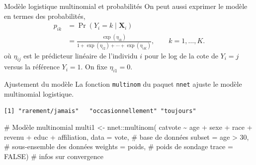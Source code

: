 \documentclass[
  ignorenonframetext,
]{beamer}
\newenvironment{Shaded}{\begin{snugshade}}{\end{snugshade}}
\newcommand{\AttributeTok}[1]{\textcolor[rgb]{0.40,0.45,0.13}{#1}}
\newcommand{\CommentTok}[1]{\textcolor[rgb]{0.37,0.37,0.37}{#1}}
\newcommand{\ConstantTok}[1]{\textcolor[rgb]{0.56,0.35,0.01}{#1}}
\newcommand{\DecValTok}[1]{\textcolor[rgb]{0.68,0.00,0.00}{#1}}
\newcommand{\FunctionTok}[1]{\textcolor[rgb]{0.28,0.35,0.67}{#1}}
\newcommand{\NormalTok}[1]{\textcolor[rgb]{0.00,0.23,0.31}{#1}}
\newcommand{\OtherTok}[1]{\textcolor[rgb]{0.00,0.23,0.31}{#1}}
\newcommand{\SpecialCharTok}[1]{\textcolor[rgb]{0.37,0.37,0.37}{#1}}
\newcommand{\StringTok}[1]{\textcolor[rgb]{0.13,0.47,0.30}{#1}}
\begin{document}
\begin{frame}{Modèle logistique multinomial et probabilités}
\protect\hypertarget{moduxe8le-logistique-multinomial-et-probabilituxe9s}{}
On peut aussi exprimer le modèle en termes des probabilités,
\begin{align*}
 p_{ik} &= \Pr(Y_i=k \mid \mathbf{X}_i) \\&= \frac{\exp(\eta_{ik})}{1+ \exp(\eta_{i2}) + \cdots + \exp(\eta_{iK})}, \qquad k =1, \ldots, K.
\end{align*} où \(\eta_{ij}\) est le prédicteur linéaire de l'individu
\(i\) pour le log de la cote de \(Y_i=j\) versus la référence \(Y_i=1\).
On fixe \(\eta_{i1}=0\).
\end{frame}

\begin{frame}[fragile]{Ajustement du modèle}
\protect\hypertarget{ajustement-du-moduxe8le}{}
La fonction \texttt{multinom} du paquet \texttt{nnet} ajuste le modèle
multinomial logistique.

\begin{Shaded}
\end{Shaded}

\begin{verbatim}
[1] "rarement/jamais"   "occasionnellement" "toujours"         
\end{verbatim}

\begin{Shaded}
\begin{Highlighting}[numbers=left,,]
\CommentTok{\# Modèle multinomial}
\NormalTok{multi1 }\OtherTok{\textless{}{-}}\NormalTok{ nnet}\SpecialCharTok{::}\FunctionTok{multinom}\NormalTok{(}
\NormalTok{  catvote }\SpecialCharTok{\textasciitilde{}}\NormalTok{ age }\SpecialCharTok{+}\NormalTok{ sexe }\SpecialCharTok{+}\NormalTok{ race }\SpecialCharTok{+}\NormalTok{ revenu }\SpecialCharTok{+} 
\NormalTok{    educ }\SpecialCharTok{+}\NormalTok{ affiliation, }
  \AttributeTok{data =}\NormalTok{ vote,       }\CommentTok{\# base de données}
  \AttributeTok{subset =}\NormalTok{ age }\SpecialCharTok{\textgreater{}} \DecValTok{30}\NormalTok{, }\CommentTok{\# sous{-}ensemble des données}
  \AttributeTok{weights =}\NormalTok{ poids,   }\CommentTok{\# poids de sondage}
  \AttributeTok{trace =} \ConstantTok{FALSE}\NormalTok{)     }\CommentTok{\# infos sur convergence}
\end{Highlighting}
\end{Shaded}
\end{frame}
\end{document}
